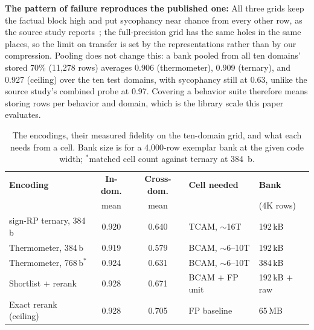 \documentclass[conference]{IEEEtran}
\newcommand{\tcam}{{TCAM}\xspace}
\newcommand{\signrp}{{sign-RP}\xspace}
\begin{document}
\textbf{The pattern of failure reproduces the published one:} All
three grids keep the factual block high and put sycophancy near
chance from every other row, as the source study
reports~\cite{ying2026spectrum}; the full-precision grid has the
same holes in the same places, so the limit on transfer is set by
the representations rather than by our compression. Pooling does not
change this: a bank pooled from all ten domains' stored 70\%
(11{,}278 rows) averages 0.906 (thermometer), 0.909
(ternary), and 0.927 (ceiling) over the ten test domains, with
sycophancy still at 0.63, unlike the source study's combined probe at
0.97. Covering a behavior suite therefore means storing rows per
behavior and domain, which is the library scale this paper
evaluates.

\begin{table}[t]
\centering
\caption{The encodings, their measured fidelity on the ten-domain
grid, and what each needs from a cell. Bank size is for a
4{,}000-row exemplar bank at the given code width; $^{*}$matched
cell count against ternary at 384~b.}
\label{tab:encodings}
{\scriptsize\setlength{\tabcolsep}{3.5pt}
\begin{tabular}{@{}lccll@{}}
\toprule
\textbf{Encoding} & \textbf{In-dom.} & \textbf{Cross-dom.} &
\textbf{Cell needed} & \textbf{Bank} \\
 & mean & mean & & (4K rows) \\
\midrule
\signrp ternary, 384\,b       & 0.920 & 0.640 & \tcam, $\sim$16T   & 192\,kB \\
Thermometer, 384\,b           & 0.919 & 0.579 & BCAM, $\sim$6--10T & 192\,kB \\
Thermometer, 768\,b$^{*}$          & 0.924 & 0.631 & BCAM, $\sim$6--10T & 384\,kB \\
Shortlist $+$ rerank          & 0.928 & 0.671 & BCAM $+$ FP unit   & 192\,kB $+$ raw \\
Exact rerank (ceiling)        & 0.928 & 0.705 & FP baseline        & 65\,MB \\
\bottomrule
\end{tabular}}
\end{table}
\end{document}
